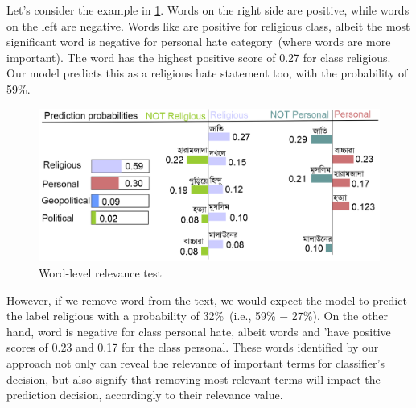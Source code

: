 \hspace*{3.5mm} Let's consider the example in 
\cref{fig:explain_term_wise_religious_hate}. Words on the right 
side are positive, while words on the left are negative. Words like %
are positive for religious class, albeit the most significant word %
is negative for personal hate category~(where words
are more important). The word %
has the highest positive score of 0.27 for class religious. Our model predicts this as a religious hate statement too, with the probability of 59\%. 

\begin{figure}[h]
    \vspace{-2mm}
	\centering
	\includegraphics[scale=0.6]{images/reli_explain.png}
	\caption{Word-level relevance test}%
    \label{fig:explain_term_wise_religious_hate}
	\vspace{-4mm}
\end{figure}

\hspace*{3.5mm} However, if we remove word %
from the text, we would expect the model to predict the label religious with a probability of 32\%~(i.e., 59\% $-$ 27\%). On the other hand, word %
is negative for class personal hate, albeit words %
and 'have positive scores of 0.23 and 0.17 for the class personal. These words identified by our approach not only can reveal the relevance of important terms for classifier’s decision, but also signify that removing most relevant terms will impact the prediction decision, accordingly to their relevance value. 


